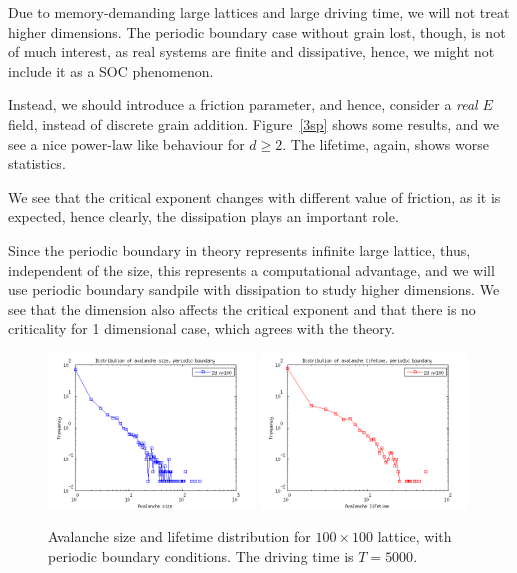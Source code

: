 Due to memory-demanding large lattices and large driving time, we will not treat higher dimensions.
The periodic boundary case without grain lost, though, is not of much interest, as real systems are finite and dissipative, hence, we might not include it as a SOC phenomenon. 

Instead, we should introduce a friction parameter, and hence, consider a \emph{real} $E$ field, instead of discrete grain addition. 
Figure~\ref{3sp} shows some results, and we see a nice power-law like behaviour for $d\geq2$. The lifetime, again, shows worse statistics.  

We see that the critical exponent changes with different value of friction, as it is expected, hence clearly, the dissipation plays an important role.

Since the periodic boundary in theory represents infinite large lattice, thus, independent of the size, this represents a computational advantage, 
and we will use periodic boundary sandpile with dissipation to study higher dimensions.
We see that the dimension also affects the critical exponent and that there is no criticality for 1 dimensional case, which agrees with the theory.





\begin{figure} 
\begin{center}
\includegraphics[width=0.49\textwidth]{results/sp.png}
\includegraphics[width=0.49\textwidth]{results/tp.png} 
\caption{Avalanche size and lifetime distribution for $100\times100$ lattice, with periodic boundary conditions. 
The driving time is $T=5000$.  }
\label{sp}
\end{center}
\end{figure} 

